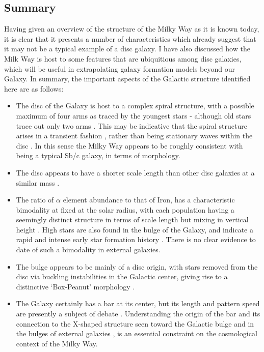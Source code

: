 \subsection{Summary}
Having given an overview of the structure of the Milky Way as it is known today, it is clear that it presents a number of characteristics which already suggest that it may not be a typical example of a disc galaxy. I have also discussed how the Milk Way is host to some features that are ubiquitious among disc galaxies, which will be useful in extrapolating galaxy formation models beyond our Galaxy. In summary, the important aspects of the Galactic structure identified here are as follows:
\begin{itemize}
    \item The disc of the Galaxy is host to a complex spiral structure, with a possible maximum of four arms as traced by the youngest stars \citep[e.g.][]{2014MNRAS.437.1791U} - although old stars trace out only two arms \citep[e.g.][]{2000A&A...358L..13D}. This may be indicative that the spiral structure arises in a transient fashion \citep[e.g.][]{2011MNRAS.410.1637S}, rather than being stationary waves within the disc \citep[e.g.][]{1964ApJ...140..646L}. In this sense the Milky Way appears to be roughly consistent with being a typical Sb/c galaxy, in terms of morphology.
    \item The disc appears to have a shorter scale length than other disc galaxies at a similar mass \citep[e.g.][]{2010MNRAS.406.1595F}.
    \item The ratio of $\alpha$ element abundance to that of Iron, \afe{} has a characteristic bimodality at fixed \feh{} at the solar radius, with each population having a seemingly distinct structure in terms of scale length but mixing in vertical height \citep[e.g.][]{2012ApJ...751..131B,2012ApJ...753..148B,2016ApJ...823...30B}. High \afe{} stars are also found in the bulge of the Galaxy, and indicate a rapid and intense early star formation history \citep[e.g.][]{2017arXiv170202971B}. There is no clear evidence to date of such a bimodality in external galaxies.
    \item The bulge appears to be mainly of a disc origin, with stars removed from the disc via buckling instabilities in the Galactic center, giving rise to a distinctive `Box-Peanut' morphology \citep[e.g.][]{2005MNRAS.358.1477A}.
    \item The Galaxy certainly has a bar at its center, but its length and pattern speed are presently a subject of debate \citep[e.g.][]{2000AJ....119..800D,2015MNRAS.450.4050W}. Understanding the origin of the bar and its connection to the X-shaped structure seen toward the Galactic bulge \citep[e.g.][]{2016AJ....152...14N} and in the bulges of external galaxies \citep{2006MNRAS.370..753B}, is an essential constraint on the cosmological context of the Milky Way.

\end{itemize}
